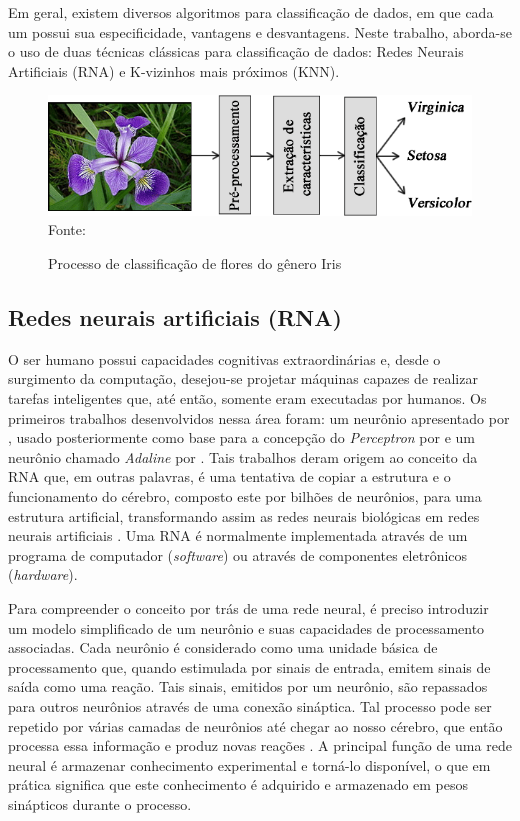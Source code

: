 Em geral, existem diversos algoritmos para classificação de dados, em que cada um possui sua especificidade, vantagens e desvantagens. Neste trabalho, aborda-se o uso de duas técnicas clássicas para classificação de dados: Redes Neurais Artificiais (RNA) e K-vizinhos mais próximos (KNN).

\begin{figure}[ht!]
\caption{Processo de classificação de flores do gênero Iris}
\label{fig:irisExample}
\centering
\includegraphics[scale=0.65]{img/irisExample.png}
{\fontsize{11pt}{\baselineskip}\selectfont
\\Fonte: \cite{pacheco2016agregaccao}
}
\end{figure}

\subsection{Redes neurais artificiais (RNA)}
O ser humano possui capacidades cognitivas extraordinárias e, desde o surgimento da computação, desejou-se projetar máquinas capazes de realizar tarefas inteligentes que, até então, somente eram  executadas por humanos. Os primeiros trabalhos desenvolvidos nessa área foram: um neurônio apresentado por \cite{mcculloch1943logical}, usado posteriormente como base para a concepção do  \textit{Perceptron} por \cite{rosenblatt1958perceptron} e um neurônio chamado \textit{Adaline} por \cite{widrow1960adaptive}. Tais trabalhos deram origem ao conceito da RNA que, em outras palavras, é uma tentativa de copiar a estrutura e o funcionamento do cérebro, composto este por bilhões de neurônios, para uma estrutura artificial, transformando assim as redes neurais biológicas em redes neurais artificiais \citep{Rauber2005}. Uma RNA é normalmente implementada através de um programa de computador (\textit{software}) ou através de componentes eletrônicos (\textit{hardware}).

Para compreender o conceito por trás de uma rede neural, é preciso introduzir um modelo simplificado de um neurônio e suas capacidades de processamento associadas. Cada neurônio é considerado como uma unidade básica de processamento que, quando estimulada por sinais de entrada, emitem sinais de saída como uma reação. Tais sinais, emitidos por um neurônio, são repassados para outros neurônios através de uma conexão sináptica. Tal processo pode ser repetido por várias camadas de neurônios até chegar ao nosso cérebro, que então processa essa informação e produz novas reações \citep{baeza1999modern}. A principal função de uma rede neural é armazenar conhecimento experimental e torná-lo disponível, o que em prática significa que este conhecimento é adquirido e armazenado em pesos sinápticos durante o processo.

